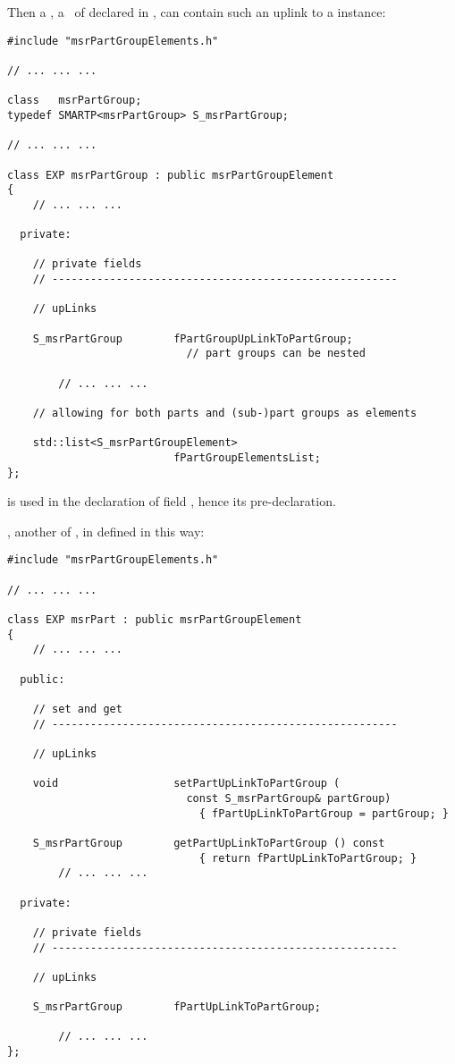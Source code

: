 Then a , a \subClass\ of  declared in , can contain such an uplink to a  instance:
\begin{lstlisting}[language=CPlusPlus]
#include "msrPartGroupElements.h"

// ... ... ...

class   msrPartGroup;
typedef SMARTP<msrPartGroup> S_msrPartGroup;

// ... ... ...

class EXP msrPartGroup : public msrPartGroupElement
{
	// ... ... ...

  private:

    // private fields
    // ------------------------------------------------------

    // upLinks

    S_msrPartGroup        fPartGroupUpLinkToPartGroup;
                            // part groups can be nested

		// ... ... ...

    // allowing for both parts and (sub-)part groups as elements

    std::list<S_msrPartGroupElement>
                          fPartGroupElementsList;
};
\end{lstlisting}

 is used in the declaration of field , hence its pre-declaration.

, another \subClass of , in defined in  this way:
\begin{lstlisting}[language=CPlusPlus]
#include "msrPartGroupElements.h"

// ... ... ...

class EXP msrPart : public msrPartGroupElement
{
	// ... ... ...

  public:

    // set and get
    // ------------------------------------------------------

    // upLinks

    void                  setPartUpLinkToPartGroup (
                            const S_msrPartGroup& partGroup)
                              { fPartUpLinkToPartGroup = partGroup; }

    S_msrPartGroup        getPartUpLinkToPartGroup () const
                              { return fPartUpLinkToPartGroup; }
		// ... ... ...

  private:

    // private fields
    // ------------------------------------------------------

    // upLinks

    S_msrPartGroup        fPartUpLinkToPartGroup;

		// ... ... ...
};
\end{lstlisting}

